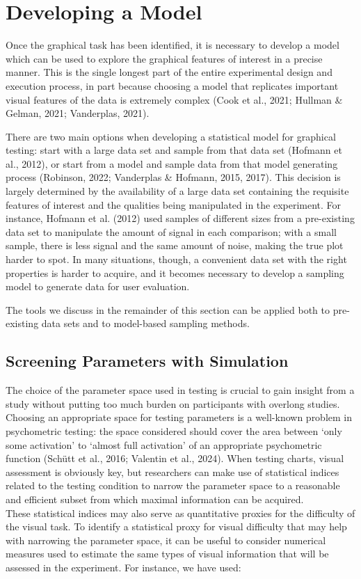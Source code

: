\documentclass[
  10pt,
]{article}
\begin{document}
\section{Developing a Model}\label{sec-model-dev}

Once the graphical task has been identified, it is necessary to develop
a model which can be used to explore the graphical features of interest
in a precise manner. This is the single longest part of the entire
experimental design and execution process, in part because choosing a
model that replicates important visual features of the data is extremely
complex (Cook et al., 2021; Hullman \& Gelman, 2021; Vanderplas, 2021).

There are two main options when developing a statistical model for
graphical testing: start with a large data set and sample from that data
set (Hofmann et al., 2012), or start from a model and sample data from
that model generating process (Robinson, 2022; Vanderplas \& Hofmann,
2015, 2017). This decision is largely determined by the availability of
a large data set containing the requisite features of interest and the
qualities being manipulated in the experiment. For instance, Hofmann et
al. (2012) used samples of different sizes from a pre-existing data set
to manipulate the amount of signal in each comparison; with a small
sample, there is less signal and the same amount of noise, making the
true plot harder to spot. In many situations, though, a convenient data
set with the right properties is harder to acquire, and it becomes
necessary to develop a sampling model to generate data for user
evaluation.

The tools we discuss in the remainder of this section can be applied
both to pre-existing data sets and to model-based sampling methods.

\subsection{Screening Parameters with
Simulation}\label{screening-parameters-with-simulation}

The choice of the parameter space used in testing is crucial to gain
insight from a study without putting too much burden on participants
with overlong studies. Choosing an appropriate space for testing
parameters is a well-known problem in psychometric testing: the space
considered should cover the area between `only some activation' to
`almost full activation' of an appropriate psychometric function (Schütt
et al., 2016; Valentin et al., 2024). When testing charts, visual
assessment is obviously key, but researchers can make use of statistical
indices related to the testing condition to narrow the parameter space
to a reasonable and efficient subset from which maximal information can
be acquired.\\
These statistical indices may also serve as quantitative proxies for the
difficulty of the visual task. To identify a statistical proxy for
visual difficulty that may help with narrowing the parameter space, it
can be useful to consider numerical measures used to estimate the same
types of visual information that will be assessed in the experiment. For
instance, we have used:
\end{document}
